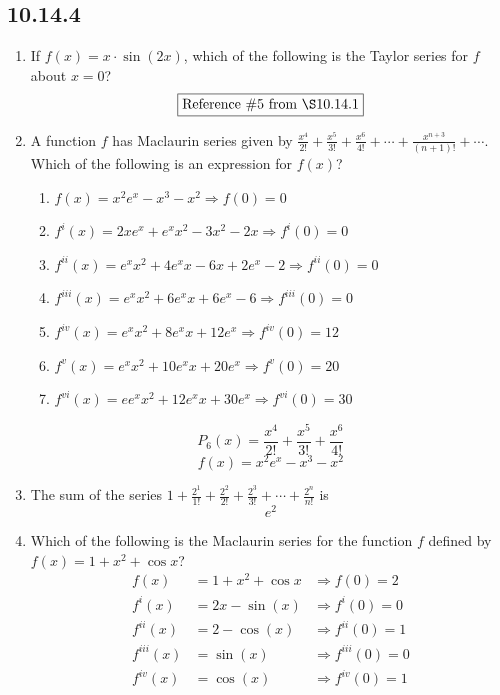\documentclass[12pt]{article}
\begin{document}
\subsection*{10.14.4}
\begin{enumerate}
	\item If $f(x)=x \cdot \sin(2x)$, which of the following is the Taylor series for $f$ about $x=0$?
		$$\boxed{\text{Reference } \# 5 \text{ from } \S 10.14.1}$$
	\item A function $f$ has Maclaurin series given by $\frac{x^4}{2!} + \frac{x^5}{3!} + \frac{x^6}{4!} + \cdots + \frac{x^{n+3}}{(n+1)!} + \cdots$. Which of the following is an expression for $f(x)$? 
	\begin{enumerate}
		\item $f(x)=x^{2}e^{x}-x^{3}-x^{2} \Longrightarrow f(0) = 0$
		\item $f^{i}(x) = 2xe^{x}+e^{x}x^{2}-3x^{2}-2x \Longrightarrow f^{i}(0) = 0$
		\item $f^{ii}(x) = e^{x}x^{2}+4e^{x}x-6x+2e^{x}-2 \Longrightarrow f^{ii}(0) = 0$
		\item $f^{iii}(x) = e^{x}x^{2}+6e^{x}x+6e^{x}-6 \Longrightarrow f^{iii}(0) = 0$
		\item $f^{iv}(x) = e^{x}x^{2}+8e^{x}x+12e^{x} \Longrightarrow f^{iv}(0) = 12$
		\item $f^{v}(x) = e^{x}x^{2}+10e^{x}x+20e^{x} \Longrightarrow f^{v}(0) = 20$
		\item $f^{vi}(x) = ee^{x}x^{2}+12e^{x}x+30e^{x} \Longrightarrow f^{vi}(0) = 30$
	\end{enumerate}
	$$P_{6}(x) = \frac{x^4}{2!} + \frac{x^5}{3!} + \frac{x^6}{4!}$$
	$$\boxed{f(x)=x^{2}e^{x}-x^{3}-x^{2}}$$
	\item The sum of the series $1 + \frac{2^1}{1!} + \frac{2^2}{2!}+ \frac{2^3}{3!} + \cdots + \frac{2^n}{n!}$ is
	$$\boxed{e^2}$$
	\item Which of the following is the Maclaurin series for the function $f$ defined by $f(x)=1+x^2+\cos x$?
		\begin{align*}
			f(x) &= 1+x^2+\cos x 	&\Longrightarrow f(0) = 2\\
			f^{i}(x) &= 2x-\sin(x) 	&\Longrightarrow f^{i}(0) = 0 \\
			f^{ii}(x) &= 2-\cos(x) 	&\Longrightarrow f^{ii}(0) = 1\\
			f^{iii}(x) &= \sin(x) 	&\Longrightarrow f^{iii}(0) = 0\\
			f^{iv}(x) &= \cos(x) 	&\Longrightarrow f^{iv}(0) = 1\\
		\end{align*}

\end{enumerate}
\end{document}
